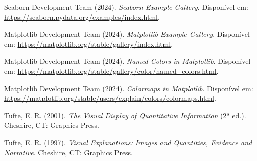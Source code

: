 \documentclass{article}
\begin{document}
\pagebreak
\begin{thebibliography}{99}

Seaborn Development Team (2024). \textit{Seaborn Example Gallery}. Disponível em: \url{https://seaborn.pydata.org/examples/index.html}.

Matplotlib Development Team (2024). \textit{Matplotlib Example Gallery}. Disponível em: \url{https://matplotlib.org/stable/gallery/index.html}.

Matplotlib Development Team (2024). \textit{Named Colors in Matplotlib}. Disponível em: \url{https://matplotlib.org/stable/gallery/color/named_colors.html}.

Matplotlib Development Team (2024). \textit{Colormaps in Matplotlib}. Disponível em: \url{https://matplotlib.org/stable/users/explain/colors/colormaps.html}.

Tufte, E. R. (2001). \textit{The Visual Display of Quantitative Information} (2ª ed.). Cheshire, CT: Graphics Press.

Tufte, E. R. (1997). \textit{Visual Explanations: Images and Quantities, Evidence and Narrative}. Cheshire, CT: Graphics Press.

\end{thebibliography}
\end{document}
